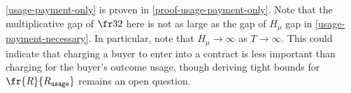 

    


\cref{usage-payment-only} is proven in \cref{proof-usage-payment-only}. Note that the multiplicative gap of $\fr32$ here is not as large as the gap of $H_\mu$ gap in \cref{usage-payment-necessary}. In particular, note that $H_\mu\to \infty$ as $T\to \infty$. This could indicate that charging a buyer to enter into a contract is less important than charging for the buyer's outcome usage, though deriving tight bounds for $\fr{R}{\Rusage}$ remains an open question.

